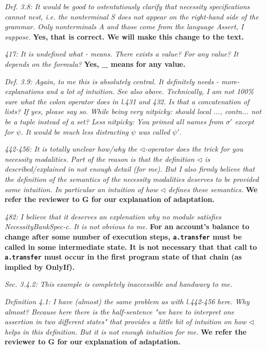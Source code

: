 \documentclass[11pt]{amsart}
\newcommand{\rev}[1]{\emph #1}
\newcommand{\us}[1]{\bf #1}
\begin{document}
{\rev {{Def. 3.8: It would be good to ostentatiously clarify that necessity specifications cannot nest, i.e. the nonterminal S does not appear on the right-hand side of the grammar. Only nonterminals A and those come from the language Assert, I suppose. }}}
{\us{Yes, that is correct. We will make this change to the text.}}

{\rev {{417: It is undefined what  - means. There exists a value? For any value? It depends on the formula? }}}
{\us{Yes, \_ means for any value.}}

{\rev {{ Def. 3.9: Again, to me this is absolutely central. It definitely needs - more- explanations and a lot of intuition. See also above. Technically, I am not 100\% sure what the colon operator does in l.431 and 432. Is that a concatenation of lists? If yes, please say so. While being very nitpicky: should {local ..., contn...} not be a tuple instead of a set? Less nitpicky: You primed all names from $\sigma'$ except for $\psi$. It would be much less distracting $\psi$ was called $\psi'$. }}}

{\rev {{442-456: It is totally unclear how/why the $\triangleleft$-operator does the trick for you necessity modalities. Part of the reason is that the definition $\triangleleft$ is described/explained in not enough detail (for me). But I also firmly believe that the definition of the semantics of the necessity modalities deserves to be provided some intuition. In particular an intuition of how $ \triangleleft$ defines these semantics. }}}
{\us{We refer the reviewer to G for our explanation of adaptation.}}

{\rev {{482: I believe that it deserves an explenation why no module satisfies NecessityBankSpec-c. It is not obvious to me. }}}
{\us{For an account's balance to change after some number of execution steps, \texttt{a.transfer} must be called in some intermediate state.
It is not necessary that that call to \texttt{a.transfer} must occur in the first program state of that chain (as implied by OnlyIf).}}

{\rev {{Sec. 3.4.2: This example is completely inaccessible and handwavy to me. }}}

{\rev {{ Definition 4.1: I have (almost) the same problem as with l.442-456 here. Why almost? Because here there is the half-sentence "we have to interpret one assertion in two different states" that provides a little bit of intuition on how $\triangleleft$ helps in this definition. But it is not enough intuition for me. }}}
{\us{We refer the reviewer to G for our explanation of adaptation.}}
\end{document}
